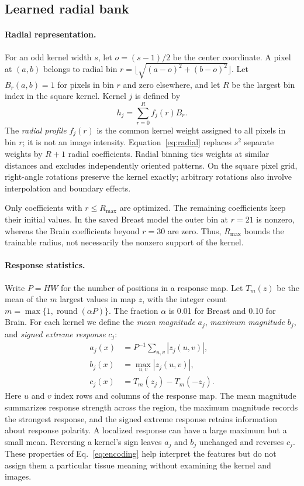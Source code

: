 \documentclass[10pt,twocolumn]{article}
\begin{document}
\subsection{Learned radial bank}
\label{sec:radial}
\paragraph{Radial representation.}
For an odd kernel width $s$, let $o=(s-1)/2$ be the center coordinate. A pixel at $(a,b)$ belongs to radial bin $r=\lfloor\sqrt{(a-o)^2+(b-o)^2}\rfloor$. Let $B_r(a,b)=1$ for pixels in bin $r$ and zero elsewhere, and let $R$ be the largest bin index in the square kernel. Kernel $j$ is defined by
\begin{equation}
h_j=\sum_{r=0}^{R} f_j(r) B_r.
\label{eq:radial}
\end{equation}
The \emph{radial profile} $f_j(r)$ is the common kernel weight assigned to all pixels in bin $r$; it is not an image intensity. Equation~\eqref{eq:radial} replaces $s^2$ separate weights by $R+1$ radial coefficients. Radial binning ties weights at similar distances and excludes independently oriented patterns. On the square pixel grid, right-angle rotations preserve the kernel exactly; arbitrary rotations also involve interpolation and boundary effects.

Only coefficients with $r\leq R_{\max}$ are optimized. The remaining coefficients keep their initial values. In the saved Breast model the outer bin at $r=21$ is nonzero, whereas the Brain coefficients beyond $r=30$ are zero. Thus, $R_{\max}$ bounds the trainable radius, not necessarily the nonzero support of the kernel.

\paragraph{Response statistics.}
Write $P=HW$ for the number of positions in a response map. Let $T_m(z)$ be the mean of the $m$ largest values in map $z$, with the integer count $m=\max\{1,\operatorname{round}(\alpha P)\}$. The fraction $\alpha$ is 0.01 for Breast and 0.10 for Brain. For each kernel we define the \emph{mean magnitude} $a_j$, \emph{maximum magnitude} $b_j$, and \emph{signed extreme response} $c_j$:
\begin{equation}
\begin{aligned}
a_j(x)&=P^{-1}\sum_{u,v}|z_j(u,v)|,\\
b_j(x)&=\max_{u,v}|z_j(u,v)|,\\
c_j(x)&=T_m(z_j)-T_m(-z_j).
\end{aligned}
\label{eq:encoding}
\end{equation}
Here $u$ and $v$ index rows and columns of the response map. The mean magnitude summarizes response strength across the region, the maximum magnitude records the strongest response, and the signed extreme response retains information about response polarity. A localized response can have a large maximum but a small mean. Reversing a kernel's sign leaves $a_j$ and $b_j$ unchanged and reverses $c_j$. These properties of Eq.~\eqref{eq:encoding} help interpret the features but do not assign them a particular tissue meaning without examining the kernel and images.
\end{document}
